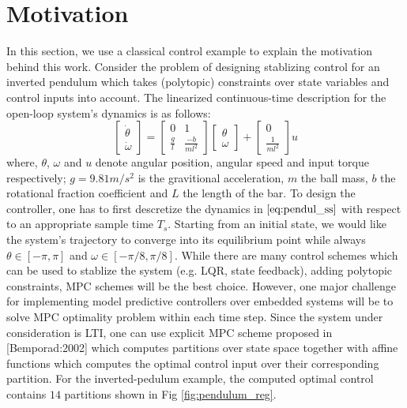 \section{Motivation}
	In this section, we use a classical control example to explain the motivation behind this work. Consider the problem of designing stablizing control for an inverted pendulum which takes (polytopic) constraints over state variables and control inputs into account. The linearized continuous-time description for the open-loop system's dynamics is as follows:
	\begin{equation}
		\begin{bmatrix}
			\dot \theta\\
			\dot \omega
		\end{bmatrix}=
		\begin{bmatrix}
			0 & 1\\
			\frac{g}{l}& \frac{-b}{ml^2}		
		\end{bmatrix}
		\begin{bmatrix}
			\theta\\
			\omega
		\end{bmatrix}+
		\begin{bmatrix}
			0\\
			\frac{1}{ml^2}
		\end{bmatrix}u
		\label{eq:pendul_ss}
	\end{equation}
	where, $\theta$, $\omega$ and $u$ denote angular position, angular speed and input torque respectively; $g=9.81 m/s^2$ is the gravitional acceleration, $m$ the ball mass, $b$ the rotational fraction coefficient and $L$ the length of the bar. To design the controller, one has to first descretize the dynamics in $\eqref{eq:pendul_ss}$ with respect to an appropriate sample time $T_s$. Starting from an initial state, we would like the system's trajectory to converge into its equilibrium point while always $\theta\in[-\pi,\pi]$ and $\omega\in[-\pi/8,\pi/8]$. While there are many control schemes which can be used to stablize the system (e.g. LQR, state feedback), adding polytopic constraints, MPC schemes will be the best choice. 
	However, one major challenge for implementing model predictive controllers over embedded systems will be to solve MPC optimality problem within each time step. Since the system under consideration is LTI, one can use explicit MPC scheme proposed in [Bemporad:2002] which computes partitions over state space together with affine functions which computes the optimal control input over their corresponding partition. For the inverted-pedulum example, the computed optimal control contains $14$ partitions shown in Fig \ref{fig:pendulum_reg}.
